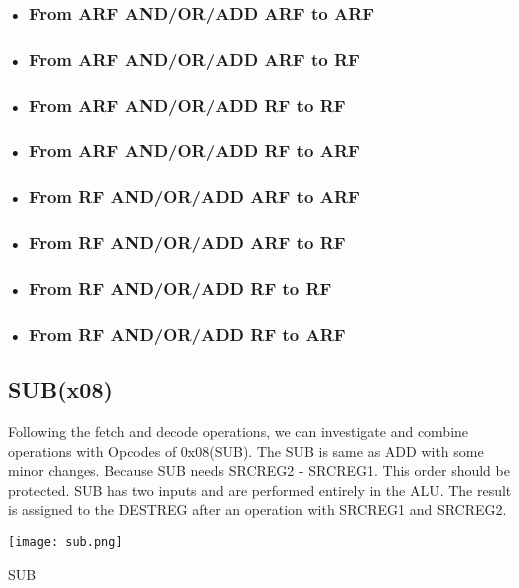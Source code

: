 \documentclass[pdftex,12pt,a4paper]{article}
\begin{document}
\subsubsection{• From ARF AND/OR/ADD ARF to ARF}
\subsubsection{• From ARF AND/OR/ADD ARF to RF}
\subsubsection{• From ARF AND/OR/ADD  RF to RF}
\subsubsection{• From ARF AND/OR/ADD RF to ARF}

\subsubsection{• From RF AND/OR/ADD ARF to ARF}
\subsubsection{• From RF AND/OR/ADD ARF to RF}
\subsubsection{• From RF AND/OR/ADD  RF to RF}
\subsubsection{• From RF AND/OR/ADD RF to ARF}
\newpage

\subsection{SUB(x08)}
Following the fetch and decode operations, we can investigate and combine operations with Opcodes of 0x08(SUB). The SUB is same as ADD with some minor changes. Because SUB needs SRCREG2 - SRCREG1. This order should be protected. SUB has two inputs and are performed entirely in the ALU. The result is assigned to the DESTREG after an operation with SRCREG1 and SRCREG2. 



\begin{figure31}
	\centering
	\texttt{[image: sub.png]}	
	\caption{SUB}
	\label{fig1}
\end{figure31}
\end{document}

